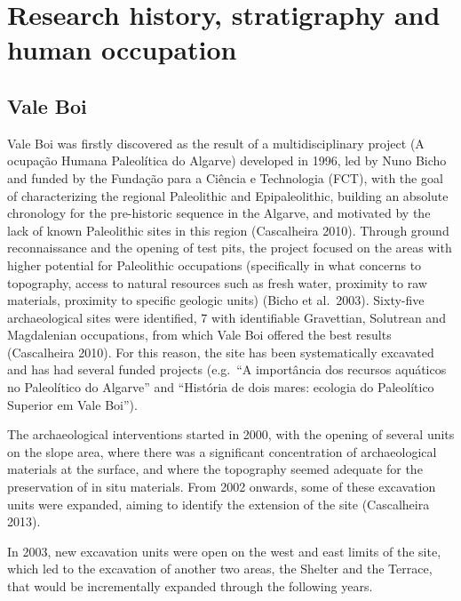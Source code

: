 \documentclass[12pt,twoside]{reedthesis}
\begin{document}
\hypertarget{research-history-stratigraphy-and-human-occupation}{%
\chapter{Research history, stratigraphy and human occupation}\label{research-history-stratigraphy-and-human-occupation}}

\hypertarget{vale-boi-1}{%
\section{Vale Boi}\label{vale-boi-1}}

Vale Boi was firstly discovered as the result of a multidisciplinary project (A ocupação Humana Paleolítica do Algarve) developed in 1996, led by Nuno Bicho and funded by the Fundação para a Ciência e Technologia (FCT), with the goal of characterizing the regional Paleolithic and Epipaleolithic, building an absolute chronology for the pre-historic sequence in the Algarve, and motivated by the lack of known Paleolithic sites in this region (Cascalheira 2010). Through ground reconnaissance and the opening of test pits, the project focused on the areas with higher potential for Paleolithic occupations (specifically in what concerns to topography, access to natural resources such as fresh water, proximity to raw materials, proximity to specific geologic units) (Bicho et al.~2003). Sixty-five archaeological sites were identified, 7 with identifiable Gravettian, Solutrean and Magdalenian occupations, from which Vale Boi offered the best results (Cascalheira 2010). For this reason, the site has been systematically excavated and has had several funded projects (e.g.~``A importância dos recursos aquáticos no Paleolítico do Algarve'' and ``História de dois mares: ecologia do Paleolítico Superior em Vale Boi'').

The archaeological interventions started in 2000, with the opening of several units on the slope area, where there was a significant concentration of archaeological materials at the surface, and where the topography seemed adequate for the preservation of in situ materials. From 2002 onwards, some of these excavation units were expanded, aiming to identify the extension of the site (Cascalheira 2013).

In 2003, new excavation units were open on the west and east limits of the site, which led to the excavation of another two areas, the Shelter and the Terrace, that would be incrementally expanded through the following years.
\end{document}
